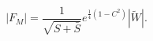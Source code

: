 \begin{equation}
|F_M| = \frac{1}{\sqrt{S + \bar S}} e^{\frac{1}{4}(1-C^2)}|\tilde W|.
\end{equation}

